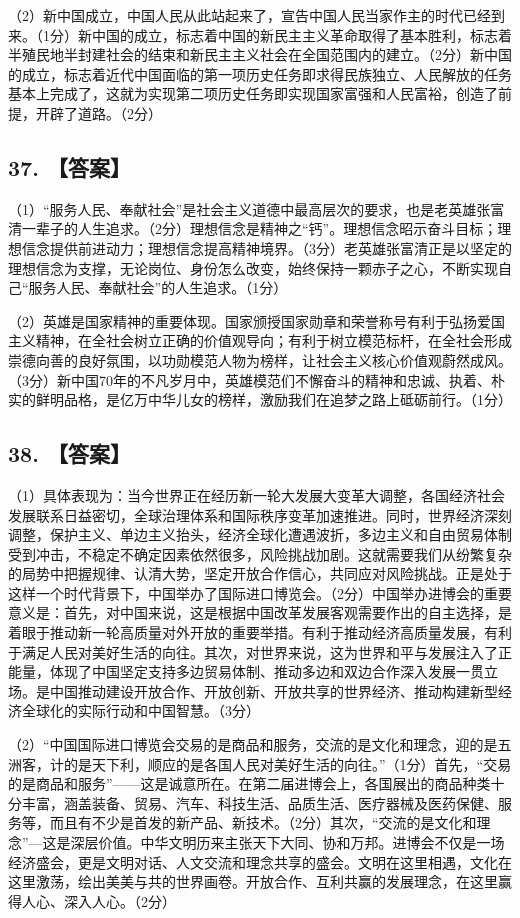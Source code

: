 \documentclass[UTF8,11pt]{ctexart}
\begin{document}
（2）新中国成立，中国人民从此站起来了，宣告中国人民当家作主的时代已经到来。（1分）新中国的成立，标志着中国的新民主主义革命取得了基本胜利，标志着半殖民地半封建社会的结束和新民主主义社会在全国范围内的建立。（2分）新中国的成立，标志着近代中国面临的第一项历史任务即求得民族独立、人民解放的任务基本上完成了，这就为实现第二项历史任务即实现国家富强和人民富裕，创造了前提，开辟了道路。（2分）


\subsection*{37. 【答案】}

（1）“服务人民、奉献社会”是社会主义道德中最高层次的要求，也是老英雄张富清一辈子的人生追求。（2分）理想信念是精神之“钙”。理想信念昭示奋斗目标；理想信念提供前进动力；理想信念提高精神境界。（3分）老英雄张富清正是以坚定的理想信念为支撑，无论岗位、身份怎么改变，始终保持一颗赤子之心，不断实现自己“服务人民、奉献社会”的人生追求。（1分）


（2）英雄是国家精神的重要体现。国家颁授国家勋章和荣誉称号有利于弘扬爱国主义精神，在全社会树立正确的价值观导向；有利于树立模范标杆，在全社会形成崇德向善的良好氛围，以功勋模范人物为榜样，让社会主义核心价值观蔚然成风。（3分）新中国70年的不凡岁月中，英雄模范们不懈奋斗的精神和忠诚、执着、朴实的鲜明品格，是亿万中华儿女的榜样，激励我们在追梦之路上砥砺前行。（1分）


\subsection*{38. 【答案】}

（1）具体表现为：当今世界正在经历新一轮大发展大变革大调整，各国经济社会发展联系日益密切，全球治理体系和国际秩序变革加速推进。同时，世界经济深刻调整，保护主义、单边主义抬头，经济全球化遭遇波折，多边主义和自由贸易体制受到冲击，不稳定不确定因素依然很多，风险挑战加剧。这就需要我们从纷繁复杂的局势中把握规律、认清大势，坚定开放合作信心，共同应对风险挑战。正是处于这样一个时代背景下，中国举办了国际进口博览会。（2分）中国举办进博会的重要意义是：首先，对中国来说，这是根据中国改革发展客观需要作出的自主选择，是着眼于推动新一轮高质量对外开放的重要举措。有利于推动经济高质量发展，有利于满足人民对美好生活的向往。其次，对世界来说，这为世界和平与发展注入了正能量，体现了中国坚定支持多边贸易体制、推动多边和双边合作深入发展一贯立场。是中国推动建设开放合作、开放创新、开放共享的世界经济、推动构建新型经济全球化的实际行动和中国智慧。（3分）


（2）“中国国际进口博览会交易的是商品和服务，交流的是文化和理念，迎的是五洲客，计的是天下利，顺应的是各国人民对美好生活的向往。”（1分）首先，“交易的是商品和服务”——这是诚意所在。在第二届进博会上，各国展出的商品种类十分丰富，涵盖装备、贸易、汽车、科技生活、品质生活、医疗器械及医药保健、服务等，而且有不少是首发的新产品、新技术。（2分）其次，“交流的是文化和理念”—这是深层价值。中华文明历来主张天下大同、协和万邦。进博会不仅是一场经济盛会，更是文明对话、人文交流和理念共享的盛会。文明在这里相遇，文化在这里激荡，绘出美美与共的世界画卷。开放合作、互利共赢的发展理念，在这里赢得人心、深入人心。（2分）
\end{document}
